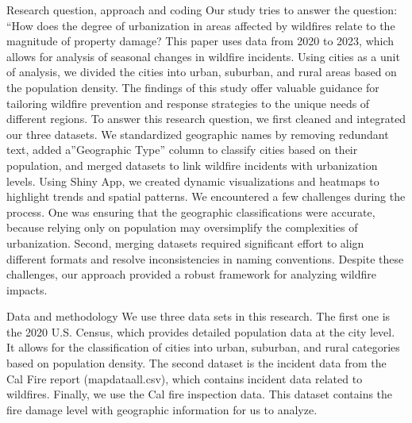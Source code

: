\documentclass[
  letterpaper,
  DIV=11,
  numbers=noendperiod]{scrartcl}
\begin{document}
Research question, approach and coding Our study tries to answer the
question: ``How does the degree of urbanization in areas affected by
wildfires relate to the magnitude of property damage? This paper uses
data from 2020 to 2023, which allows for analysis of seasonal changes in
wildfire incidents. Using cities as a unit of analysis, we divided the
cities into urban, suburban, and rural areas based on the population
density. The findings of this study offer valuable guidance for
tailoring wildfire prevention and response strategies to the unique
needs of different regions. To answer this research question, we first
cleaned and integrated our three datasets. We standardized geographic
names by removing redundant text, added a''Geographic Type'' column to
classify cities based on their population, and merged datasets to link
wildfire incidents with urbanization levels. Using Shiny App, we created
dynamic visualizations and heatmaps to highlight trends and spatial
patterns. We encountered a few challenges during the process. One was
ensuring that the geographic classifications were accurate, because
relying only on population may oversimplify the complexities of
urbanization. Second, merging datasets required significant effort to
align different formats and resolve inconsistencies in naming
conventions. Despite these challenges, our approach provided a robust
framework for analyzing wildfire impacts.

Data and methodology We use three data sets in this research. The first
one is the 2020 U.S. Census, which provides detailed population data at
the city level. It allows for the classification of cities into urban,
suburban, and rural categories based on population density. The second
dataset is the incident data from the Cal Fire report (mapdataall.csv),
which contains incident data related to wildfires. Finally, we use the
Cal fire inspection data. This dataset contains the fire damage level
with geographic information for us to analyze.
\end{document}
